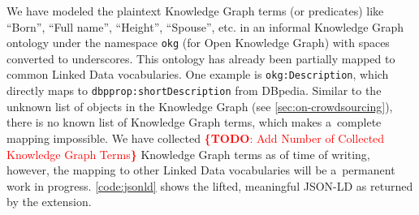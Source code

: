 \documentclass[runningheads,a4paper]{llncs}
\newcommand{\todo}[1]{\noindent\textcolor{red}{{\bf \{TODO}: #1{\bf \}}}}
\begin{document}

We have modeled the plaintext Knowledge Graph terms (or predicates)
like ``Born'', ``Full name'', ``Height'', ``Spouse'', etc.
in an informal Knowledge Graph ontology under the namespace \texttt{okg}
(for Open Knowledge Graph) with spaces converted to underscores.
This ontology has already been partially mapped to common Linked Data vocabularies.
One example is \texttt{okg:Description},
which directly maps to \texttt{dbpprop:shortDescription} from DBpedia.
Similar to the unknown list of objects in the Knowledge Graph (see \autoref{sec:on-crowdsourcing}),
there is no known list of Knowledge Graph terms,
which makes a~complete mapping impossible.
We have collected \todo{Add Number of Collected Knowledge Graph Terms} Knowledge Graph terms
as of time of writing, however, the mapping to other Linked Data vocabularies
will be a~permanent work in progress.
\autoref{code:jsonld} shows the lifted, meaningful JSON-LD as returned by the extension.
\end{document}
